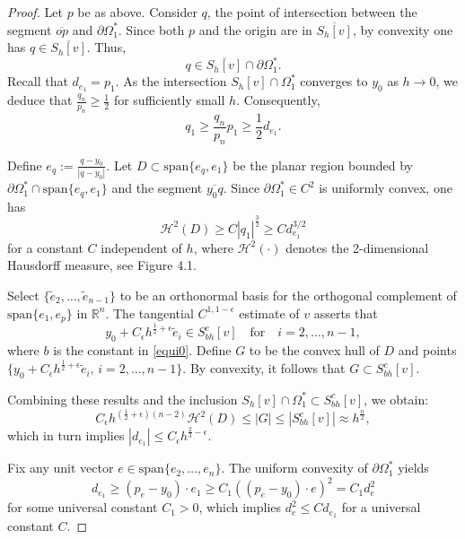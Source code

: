 \documentclass[11pt]{amsart}
\theoremstyle{plain}
\newcommand{\0}{\textbf{0}}
\numberwithin{equation}{section}
\numberwithin{equation}{section}
\numberwithin{figure}{section}
\begin{document}
\begin{proof}
Let \( p \) be as above. Consider \( q \), the point of intersection between the segment \( \overline{op} \) and \( \partial\Omega_1^* \). 
Since both \( p \) and the origin are in \( \overline{S_h[v]} \), by convexity one has \( q \in \overline{S_h[v]} \). Thus,
\[ q \in \overline{S_h[v]} \cap \partial\Omega_1^*. \]
Recall that \( d_{e_1} = p_1 \). 
As the intersection \( S_h[v] \cap \Omega_1^* \) converges to \( y_0 \) as \( h\rightarrow 0 \), we deduce that \( \frac{q_n}{p_n} \geq \frac{1}{2} \) for sufficiently small \( h \). Consequently,
\[ q_1 \geq \frac{q_n}{p_n} p_1 \geq \frac{1}{2} d_{e_1}. \] 

Define \( e_q := \frac{q - y_0}{|q - y_0|} \). 
Let \( D \subset \mathrm{span}\{e_q, e_1\} \) be the planar region bounded by \( \partial\Omega_1^* \cap \mathrm{span}\{e_q, e_1\} \) and the segment \( \overline{y_0q} \). 
Since \( \partial\Omega_1^*\in C^2 \) is uniformly convex, one has 
	\[ \mathcal{H}^2(D) \geq C|q_1|^{\frac{3}{2}} \geq Cd_{e_1}^{3/2} \] 
for a constant \( C \) independent of \( h \), where \( \mathcal{H}^2(\cdot) \) denotes the 2-dimensional Hausdorff measure, see Figure 4.1.

Select \( \{\tilde{e}_2, \ldots, \tilde{e}_{n-1}\} \) to be an orthonormal basis for the orthogonal complement of \( \mathrm{span}\{e_1, e_p\} \) in \( \mathbb{R}^n \). The tangential \( C^{1, 1-\epsilon} \) estimate of \( v \) asserts that
\[ y_0 + C_\epsilon h^{\frac{1}{2}+\epsilon}\tilde{e}_i \in S^c_{bh}[v] \quad \text{for} \quad i=2, \ldots, n-1, \]
where \( b \) is the constant in \eqref{equi0}.
Define \( G \) to be the convex hull of \( D \) and points \(\{ y_0 + C_\epsilon h^{\frac{1}{2}+\epsilon}\tilde{e}_i, \, i=2, \ldots, n-1 \}\). By convexity, it follows that \( G \subset S^c_{bh}[v] \).

Combining these results and the inclusion $S_h[v]\cap \Omega_1^* \subset S^c_{bh}[v]$, we obtain:
\[
C_\epsilon h^{(\frac{1}{2}+\epsilon)(n-2)}\mathcal{H}^2(D) \leq |G| \leq |S^c_{bh}[v]| \approx h^{\frac{n}{2}},
\]
which in turn implies $|d_{e_1}| \leq C_{\epsilon}h^{\frac{2}{3} - \epsilon}$.

Fix any unit vector $e \in \mathrm{span}\{e_2, \ldots, e_n\}$. The uniform convexity of $\partial\Omega_1^*$ yields 
	\[ d_{e_1} \geq (p_e-y_0) \cdot e_1 \geq C_1((p_e-y_0) \cdot e)^2 = C_1d_e^2  \]
for some universal constant $C_1>0$, which implies $d_e^2 \leq C d_{e_1}$ for a universal constant $C$.
\end{proof}
\end{document}
